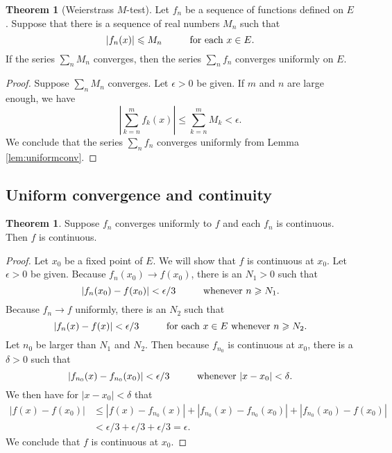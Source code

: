 \documentclass[12pt]{article}
\theoremstyle{definition}
\theoremstyle{theorem}
\newtheorem{theorem}[definition]{Theorem}
\begin{document}
\begin{theorem}[Weierstrass $M$-test]
Let $f_n$ be a sequence of functions defined on $E$. Suppose that there is a sequence of real numbers $M_n$ such that 
\[
|f_n(x)| \leqslant M_n \hspace{10mm} \text{for each $x \in E$}.
\]
If the series $\sum_n M_n$ converges, then the series $\sum_n f_n$ converges uniformly on $E$. 
\end{theorem}

\begin{proof}
Suppose $\sum_n M_n$ converges. Let $\epsilon > 0$ be given. If $m$ and $n$ are large enough, we have 
\[
\left|\sum_{k=n}^m f_k(x)\right| \leqslant \sum_{k=n}^m M_k < \epsilon.
\]
We conclude that the series $\sum_n f_n$ converges uniformly from Lemma \ref{lem:uniformconv}. 
\end{proof}

\subsection{Uniform convergence and continuity}

\begin{theorem}\label{thm:unifcont}
Suppose $f_n$ converges uniformly to $f$ and each $f_n$ is continuous. Then $f$ is continuous. 
\end{theorem}

\begin{proof}
Let $x_0$ be a fixed point of $E$. We will show that $f$ is continuous at $x_0$. Let $\epsilon > 0$ be given. Because $f_n(x_0) \to f(x_0)$,  there is an $N_1 > 0$ such that  
\[
|f_n(x_0) - f(x_0)| < \epsilon/3 \hspace{10mm} \text{whenever $n \geqslant N_1$.}
\]
Because $f_n \to f$ uniformly, there is an $N_2$ such that  
\[
|f_n(x) - f(x) | < \epsilon/3 \hspace{10mm} \text{for each $x \in E$ whenever $n \geqslant N_2$.}
\]
Let $n_0$ be larger than $N_1$ and $N_2$. Then because $f_{n_0}$ is continuous at $x_0$, there is a $\delta > 0$ such that  
\[
|f_{n_0}(x) - f_{n_0}(x_0)| < \epsilon/3 \hspace{10mm} \text{whenever $|x - x_0| < \delta$.}
\] 
We then have for $|x - x_0| <\delta$ that 
\begin{align*}
|f(x) - f(x_0)| &\leqslant |f(x) - f_{n_0}(x)| + |f_{n_0}(x) - f_{n_0}(x_0)| + |f_{n_0}(x_0) - f(x_0)|  \\
&< \epsilon/3 + \epsilon/3 + \epsilon/3 = \epsilon.
\end{align*}
We conclude that $f$ is continuous at $x_0$. 
\end{proof}
\end{document}
